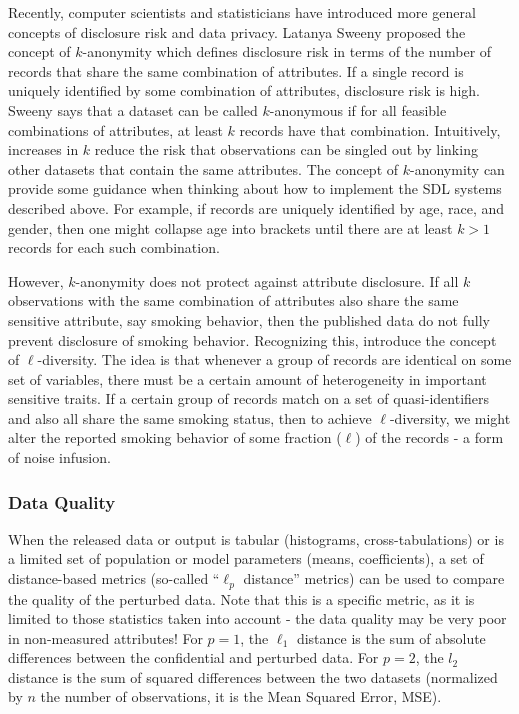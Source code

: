 \documentclass[
]{WileySix}
\begin{document}
Recently, computer scientists and statisticians have introduced more general concepts of disclosure risk and data privacy. Latanya Sweeny proposed the concept of \(k\)-anonymity \citep{sweeney_achieving_2002} which defines disclosure risk in terms of the number of records that share the same combination of attributes. If a single record is uniquely identified by some combination of attributes, disclosure risk is high. Sweeny says that a dataset can be called \(k\)-anonymous if for all feasible combinations of attributes, at least \(k\) records have that combination. Intuitively, increases in \(k\) reduce the risk that observations can be singled out by linking other datasets that contain the same attributes.
The concept of \(k\)-anonymity can provide some guidance when thinking about how to implement the SDL systems described above. For example, if records are uniquely identified by age, race, and gender, then one might collapse age into brackets until there are at least \(k>1\) records for each such combination.

However, \(k\)-anonymity does not protect against attribute disclosure. If all \(k\) observations with the same combination of attributes also share the same sensitive attribute, say smoking behavior, then the published data do not fully prevent disclosure of smoking behavior. Recognizing this, \citet{machanavajjhala_l-diversity_2007} introduce the concept of \(\ell\)-diversity. The idea is that whenever a group of records are identical on some set of variables, there must be a certain amount of heterogeneity in important sensitive traits. If a certain group of records match on a set of quasi-identifiers and also all share the same smoking status, then to achieve \(\ell\)-diversity, we might alter the reported smoking behavior of some fraction (\(\ell\)) of the records - a form of noise infusion.

\hypertarget{data-quality}{%
\subsubsection{Data Quality}\label{data-quality}}

When the released data or output is tabular (histograms, cross-tabulations) or is a limited set of population or model parameters (means, coefficients), a set of distance-based metrics (so-called ``\(\ell_p\) distance'' metrics) can be used to compare the quality of the perturbed data. Note that this is a specific metric, as it is limited to those statistics taken into account - the data quality may be very poor in non-measured attributes! For \(p=1\), the \(\ell_1\) distance is the sum of absolute differences between the confidential and perturbed data. For \(p = 2\), the \(l_2\) distance is the sum of squared differences between the two datasets (normalized by \(n\) the number of observations, it is the Mean Squared Error, MSE).
\end{document}
